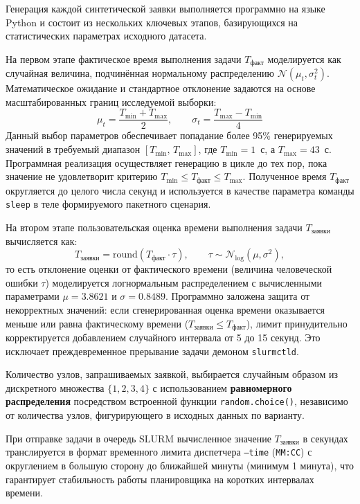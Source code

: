 Генерация каждой синтетической заявки выполняется программно на языке Python и состоит из нескольких ключевых этапов, базирующихся на статистических параметрах исходного датасета.

На первом этапе фактическое время выполнения задачи $T_{\text{факт}}$ моделируется как случайная величина, подчинённая нормальному распределению $\mathcal{N}(\mu_t, \sigma_t^2)$. Математическое ожидание и стандартное отклонение задаются на основе масштабированных границ исследуемой выборки:
\[
\mu_t = \frac{T_{\text{min}} + T_{\text{max}}}{2}, \qquad \sigma_t = \frac{T_{\text{max}} - T_{\text{min}}}{4}
\]
Данный выбор параметров обеспечивает попадание более 95\% генерируемых значений в требуемый диапазон $[T_{\text{min}},\, T_{\text{max}}]$, где $T_{\text{min}} = 1$~с, а $T_{\text{max}} = 43$~с. Программная реализация осуществляет генерацию в цикле до тех пор, пока значение не удовлетворит критерию $T_{\text{min}} \le T_{\text{факт}} \le T_{\text{max}}$. Полученное время $T_{\text{факт}}$ округляется до целого числа секунд и используется в качестве параметра команды \texttt{sleep} в теле формируемого пакетного сценария.

На втором этапе пользовательская оценка времени выполнения задачи $T_{\text{заявки}}$ вычисляется как:
\[
T_{\text{заявки}} = \text{round}(T_{\text{факт}} \cdot \tau), \qquad \tau \sim \mathcal{N}_{\text{log}}(\mu, \sigma^2),
\]
то есть отклонение оценки от фактического времени (величина человеческой ошибки $\tau$) моделируется логнормальным распределением с вычисленными параметрами $\mu = 3.8621$ и $\sigma = 0.8489$. Программно заложена защита от некорректных значений: если сгенерированная оценка времени оказывается меньше или равна фактическому времени ($T_{\text{заявки}} \le T_{\text{факт}}$), лимит принудительно корректируется добавлением случайного интервала от 5 до 15 секунд. Это исключает преждевременное прерывание задачи демоном \texttt{slurmctld}.

Количество узлов, запрашиваемых заявкой, выбирается случайным образом из дискретного множества $\{1, 2, 3, 4\}$ с использованием \textbf{равномерного распределения} посредством встроенной функции \texttt{random.choice()}, независимо от количества узлов, фигурирующего в исходных данных по варианту.

При отправке задачи в очередь SLURM вычисленное значение $T_{\text{заявки}}$ в секундах транслируется в формат временного лимита диспетчера \texttt{--time} (\texttt{ММ:СС}) с округлением в большую сторону до ближайшей минуты (минимум 1 минута), что гарантирует стабильность работы планировщика на коротких интервалах времени.

